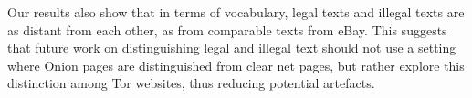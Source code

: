 \documentclass[11pt,a4paper,table]{article}
\begin{document}
  Our results also show that in terms of vocabulary, legal texts and illegal texts are as distant from each other, as from
  comparable texts from eBay.
  This suggests that future work on distinguishing legal and illegal text should not use a setting where Onion pages
    are distinguished from clear net pages, but rather explore this distinction among Tor websites, 
    thus reducing potential artefacts.




\end{document}
